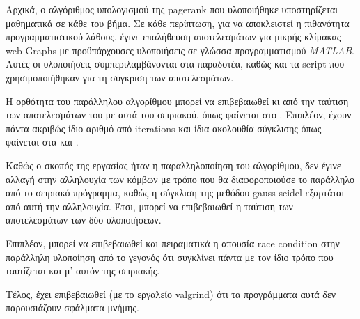 Αρχικά, ο αλγόριθμος υπολογισμού της pagerank που υλοποιήθηκε υποστηρίζεται μαθηματικά σε κάθε του βήμα. Σε κάθε περίπτωση, για να αποκλειστεί η πιθανότητα προγραμματιστικού λάθους, έγινε επαλήθευση αποτελεσμάτων για μικρής κλίμακας web-Graphs με προϋπάρχουσες υλοποιήσεις \parencite{mastersthesis} σε γλώσσα προγραμματισμού \textit{MATLAB}. Αυτές οι υλοποιήσεις συμπεριλαμβάνονται στα παραδοτέα, καθώς και τα script που χρησιμοποιήθηκαν για τη σύγκριση των αποτελεσμάτων.

Η ορθότητα του παράλληλου αλγορίθμου μπορεί να επιβεβαιωθεί κι από την ταύτιση των αποτελεσμάτων του με αυτά του σειριακού, όπως φαίνεται στο . Επιπλέον, έχουν πάντα ακριβώς ίδιο αριθμό από iterations και ίδια ακολουθία σύγκλισης όπως φαίνεται στα  και .

Καθώς ο σκοπός της εργασίας ήταν η παραλληλοποίηση του αλγορίθμου, δεν έγινε αλλαγή στην αλληλουχία των κόμβων με τρόπο που θα διαφοροποιούσε το παράλληλο από το σειριακό πρόγραμμα, καθώς η σύγκλιση της μεθόδου gauss-seidel εξαρτάται από αυτή την αλληλουχία. Έτσι, μπορεί να επιβεβαιωθεί η ταύτιση των αποτελεσμάτων των δύο υλοποιήσεων.

Επιπλέον, μπορεί να επιβεβαιωθεί και πειραματικά η απουσία race condition στην παράλληλη υλοποίηση από το γεγονός ότι συγκλίνει πάντα με τον ίδιο τρόπο που ταυτίζεται και μ' αυτόν της σειριακής.

Τέλος, έχει επιβεβαιωθεί (με το εργαλείο valgrind) ότι τα προγράμματα αυτά δεν παρουσιάζουν σφάλματα μνήμης.
